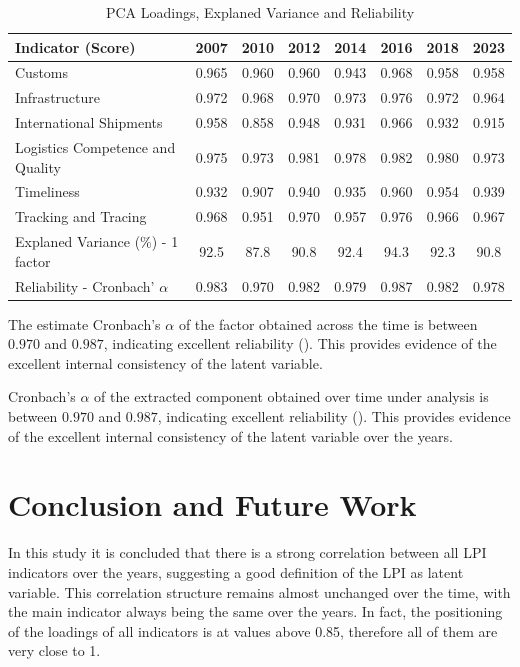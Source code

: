 \documentclass[conference]{IEEEtran}
\begin{document}
\begin{table}[h]
  \caption{PCA Loadings, Explaned Variance and Reliability}
  \label{tab:loadings}
  \centering
\begin{tabular}{lccccccc}
\hline
\textbf{Indicator (Score)}	&	\textbf{2007}	&	\textbf{2010}	&	\textbf{2012}	&	\textbf{2014}	&	\textbf{2016}	&	\textbf{2018}	&	\textbf{2023}	\\  
\hline
Customs	&	0.965	&	0.960	&	0.960	&	0.943	&	0.968	&	0.958	&	0.958	\\	
Infrastructure	&	0.972	&	0.968	&	0.970	&	0.973	&	0.976	&	0.972	&	0.964	\\	
International Shipments	&	0.958	&	0.858	&	0.948	&	0.931	&	0.966	&	0.932	&	0.915	\\	
Logistics Competence and Quality	&	0.975	&	0.973	&	0.981	&	0.978	&	0.982	&	0.980	&	0.973	\\	
Timeliness	&	0.932	&	0.907	&	0.940	&	0.935	&	0.960	&	0.954	&	0.939	\\	
Tracking and Tracing	&	0.968	&	0.951	&	0.970	&	0.957	&	0.976	&	0.966	&	0.967	\\	\hline
Explaned Variance (\%) - 1 factor 	&	92.5	&	87.8	&	90.8	&	92.4	&	94.3	&	92.3	&	90.8	\\	\hline
Reliability - Cronbach' $\alpha$	&	0.983	&	0.970	&	0.982	&	0.979	&	0.987	&	0.982	&	0.978	\\	\hline
\end{tabular}
\end{table}

The estimate Cronbach's $\alpha$ of the factor obtained across the time is between $0.970$ and $0.987$, indicating excellent reliability (\cite{pestana2008analise}). This provides evidence of the excellent internal consistency of the latent variable.

Cronbach's $\alpha$ of the extracted component obtained over time under analysis is between $0.970$ and $0.987$, indicating excellent reliability (\cite{pestana2008analise}). This provides evidence of the excellent internal consistency of the latent variable over the years.

\section{Conclusion and Future Work}

In this study it is concluded that there is a strong correlation between all LPI indicators over the years, suggesting a good definition of the LPI as latent variable. This correlation structure remains almost unchanged over the time, with the main indicator always being the same over the years. In fact, the positioning of the loadings of all indicators is at values above 0.85, therefore all of them are very close to 1.
\end{document}

